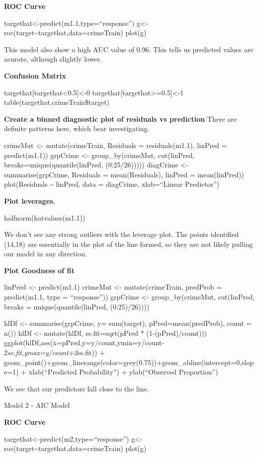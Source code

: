 \documentclass[
]{article}
\begin{document}
\textbf{ROC Curve}

targethat\textless-predict(m1.1,type=``response'')
g\textless-roc(target\textasciitilde targethat,data=crimeTrain) plot(g)

This model also show a high AUC value of 0.96. This tells us predicted
values are acurate, although slightly lower.

\textbf{Confusion Matrix}

targethat{[}targethat\textless0.5{]}\textless-0
targethat{[}targethat\textgreater=0.5{]}\textless-1
table(targethat,crimeTrain\$target)

\textbf{Create a binned diagnostic plot of residuals vs prediction}
There are definite patterns here, which bear investigating.

crimeMut \textless- mutate(crimeTrain, Residuals = residuals(m1.1),
linPred = predict(m1.1)) grpCrime \textless- group\_by(crimeMut,
cut(linPred, breaks=unique(quantile(linPred, (0:25/26))))) diagCrime
\textless- summarise(grpCrime, Residuals = mean(Residuals), linPred =
mean(linPred)) plot(Residuals \textasciitilde{} linPred, data =
diagCrime, xlab=``Linear Predictor'')

\textbf{Plot leverages.}

halfnorm(hatvalues(m1.1))

We don't see any strong outliers with the leverage plot. The points
identified (14,18) are essentially in the plot of the line formed, so
they are not likely pulling our model in any direction.

\textbf{Plot Goodness of fit}

linPred \textless- predict(m1.1) crimeMut \textless- mutate(crimeTrain,
predProb = predict(m1.1, type = ``response'')) grpCrime \textless-
group\_by(crimeMut, cut(linPred, breaks = unique(quantile(linPred,
(0:25)/26))))

hlDf \textless- summarise(grpCrime, y= sum(target),
pPred=mean(predProb), count = n()) hlDf \textless- mutate(hlDf,
se.fit=sqrt(pPred * (1-(pPred)/count)))
ggplot(hlDf,aes(x=pPred,y=y/count,ymin=y/count-2\emph{se.fit,ymax=y/count+2}se.fit))
+
geom\_point()+geom\_linerange(color=grey(0.75))+geom\_abline(intercept=0,slope=1)
+ xlab(``Predicted Probability'') + ylab(``Observed Proportion'')

We see that our predictors fall close to the line.

Model 2 - AIC Model

\textbf{ROC Curve}

targethat\textless-predict(m2,type=``response'')
g\textless-roc(target\textasciitilde targethat,data=crimeTrain) plot(g)
\end{document}
